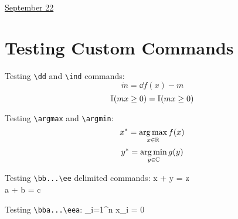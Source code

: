 \documentclass[11pt,letterpaper]{article}
\begin{document}
\href{run:2025-09-22-test.tex}{\Huge September 22} 

\section{Testing Custom Commands}

Testing \verb|\dd| and \verb|\ind| commands:
$$\dot m = \dd f(x) - m$$
$$\mathbb{I}(mx \geq 0) = \mathbb{I}(mx \geq 0)$$

Testing \verb|\argmax| and \verb|\argmin|:
$$x^* = \operatorname*{arg\,max}_{x \in \mathbb{R}} f(x)$$
$$y^* = \operatorname*{arg\,min}_{y \in \mathbb{C}} g(y)$$

Testing \verb|\bb...\ee| delimited commands:
\bb
x + y = z \\
a + b = c
\ee

Testing \verb|\bba...\eea|:
\bba
\label{eq:test}
\sum_{i=1}^n x_i = 0
\eea
\end{document}
